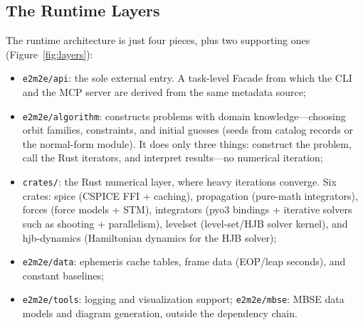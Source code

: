 \subsection{The Runtime Layers}

The runtime architecture is just four pieces, plus two supporting ones
(Figure~\ref{fig:layers}):

\begin{itemize}
  \item \texttt{e2m2e/api}: the sole external entry. A task-level Facade from
        which the CLI and the MCP server are derived from the same metadata
        source;
  \item \texttt{e2m2e/algorithm}: constructs problems with domain
        knowledge---choosing orbit families, constraints, and initial guesses
        (seeds from catalog records or the normal-form module). It does only
        three things: construct the problem, call the Rust iterators, and
        interpret results---no numerical iteration;
  \item \texttt{crates/}: the Rust numerical layer, where heavy iterations
        converge. Six crates: spice (CSPICE FFI + caching), propagation
        (pure-math integrators), forces (force models + STM), integrators
        (pyo3 bindings + iterative solvers such as shooting + parallelism),
        levelset (level-set/HJB solver kernel), and hjb-dynamics (Hamiltonian
        dynamics for the HJB solver);
  \item \texttt{e2m2e/data}: ephemeris cache tables, frame data
        (EOP/leap seconds), and constant baselines;
  \item \texttt{e2m2e/tools}: logging and visualization support;
        \texttt{e2m2e/mbse}: MBSE data models and diagram generation,
        outside the dependency chain.
\end{itemize}

